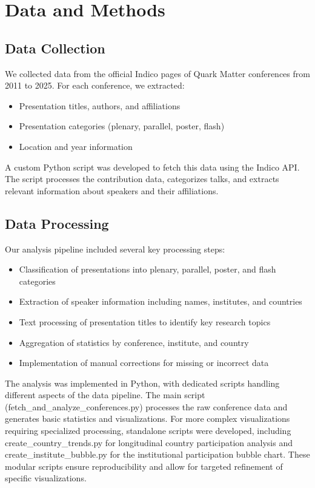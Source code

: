\documentclass[a4paper,11pt]{article}
\begin{document}
\section{Data and Methods}

\subsection{Data Collection}

We collected data from the official Indico pages of Quark Matter conferences from 2011 to 2025. For each conference, we extracted:
\begin{itemize}
    \item Presentation titles, authors, and affiliations
    \item Presentation categories (plenary, parallel, poster, flash)
    \item Location and year information
\end{itemize}

A custom Python script was developed to fetch this data using the Indico API. The script processes the contribution data, categorizes talks, and extracts relevant information about speakers and their affiliations.

\subsection{Data Processing}

Our analysis pipeline included several key processing steps:
\begin{itemize}
    \item Classification of presentations into plenary, parallel, poster, and flash categories
    \item Extraction of speaker information including names, institutes, and countries
    \item Text processing of presentation titles to identify key research topics
    \item Aggregation of statistics by conference, institute, and country
    \item Implementation of manual corrections for missing or incorrect data
\end{itemize}

The analysis was implemented in Python, with dedicated scripts handling different aspects of the data pipeline. The main script (fetch\_and\_analyze\_conferences.py) processes the raw conference data and generates basic statistics and visualizations. For more complex visualizations requiring specialized processing, standalone scripts were developed, including create\_country\_trends.py for longitudinal country participation analysis and create\_institute\_bubble.py for the institutional participation bubble chart. These modular scripts ensure reproducibility and allow for targeted refinement of specific visualizations.
\end{document}
